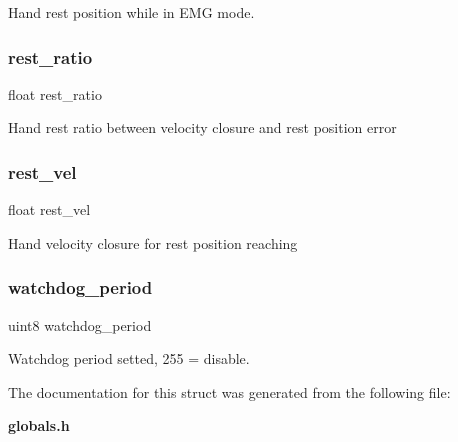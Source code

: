 Hand rest position while in E\+MG mode. \mbox{\label{structst__mem_a36ce85c7c822c5a1c014aed67f47f5e7}} 
\subsubsection{rest\+\_\+ratio}
{\footnotesize\ttfamily float rest\+\_\+ratio}

Hand rest ratio between velocity closure and rest position error \mbox{\label{structst__mem_ac1ad7e4ba4a8bd648b4f8d9ee6105e3c}} 
\subsubsection{rest\+\_\+vel}
{\footnotesize\ttfamily float rest\+\_\+vel}

Hand velocity closure for rest position reaching \mbox{\label{structst__mem_a1aae70aad54a04c7b41a8d2dcd7aba14}} 
\subsubsection{watchdog\+\_\+period}
{\footnotesize\ttfamily uint8 watchdog\+\_\+period}

Watchdog period setted, 255 = disable. 

The documentation for this struct was generated from the following file\+:\begin{DoxyCompactItemize}
\item 
\textbf{ globals.\+h}\end{DoxyCompactItemize}
